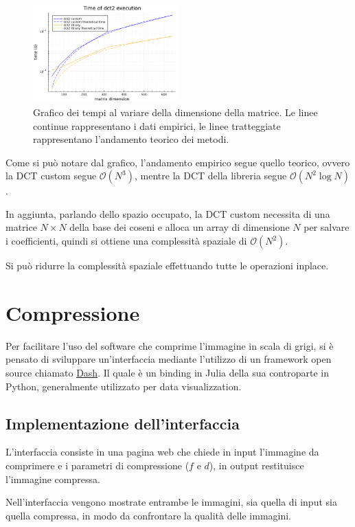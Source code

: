 \newpage
\begin{figure}[!ht]
    \centering
    \includegraphics[width=0.5\textwidth]{Progetto_2/img/times_plot.png}
    \caption{Grafico dei tempi al variare della dimensione della matrice. Le linee
        continue rappresentano i dati empirici, le linee tratteggiate rappresentano
        l'andamento teorico dei metodi.}
    \label{fig:analisi_complex}
\end{figure}

Come si può notare dal grafico, l'andamento empirico segue quello teorico, ovvero
la DCT custom segue $\mathcal{O}(N^3)$, mentre la DCT della libreria segue $\mathcal{O}(N^2\log N)$.

In aggiunta, parlando dello spazio occupato, la DCT custom necessita di una matrice
$N \times N$ della base dei coseni e alloca un array di dimensione $N$ per salvare
i coefficienti, quindi si ottiene una complessità spaziale di $\mathcal{O}(N^2)$.

Si può ridurre la complessità spaziale effettuando tutte le operazioni inplace.

\section{Compressione}
Per facilitare l'uso del software che comprime l'immagine in scala di grigi, si
è pensato di sviluppare un'interfaccia mediante l'utilizzo di un framework open
source chiamato \href{https://github.com/plotly/dash}{Dash}. Il quale è un binding
in Julia della sua controparte in Python, generalmente utilizzato per data
visualizzation.

\subsection{Implementazione dell'interfaccia}
L'interfaccia consiste in una pagina web che chiede in input l'immagine da comprimere
e i parametri di compressione ($f$ e $d$), in output restituisce l'immagine compressa.

Nell'interfaccia vengono mostrate entrambe le immagini, sia quella di input sia quella
compressa, in modo da confrontare la qualità delle immagini.

